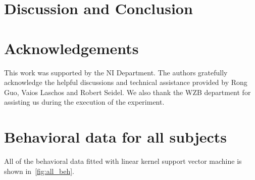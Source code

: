 \documentclass{article}
\begin{document}
\section{Discussion and Conclusion}\label{sec:discussion}


\section*{Acknowledgements}

This work was supported by the NI Department. The authors gratefully acknowledge the helpful discussions and technical assistance provided by Rong Guo, Vaios Laschos and Robert Seidel.
We also thank the WZB department for assisting us during the execution of the experiment.


\nocite{langley00}






\newpage

\onecolumn

\appendix
\section{Behavioral data for all subjects}\label{sec:appendix}
All of the behavioral data fitted with linear kernel support vector machine is shown in~\autoref{fig:all_beh}.
\end{document}
